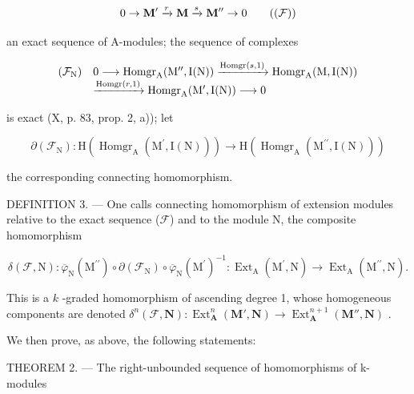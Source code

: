 \[
0 \rightarrow \mathbf {M} ^ {\prime} \xrightarrow {r} \mathbf {M} \xrightarrow {s} \mathbf {M} ^ {\prime \prime} \rightarrow 0\tag{$(\mathcal{F})$}
\]

an exact sequence of A-modules; the sequence of complexes

\[
\begin{array}{r l} (\mathcal {F} _ {\mathrm{N}}) & 0 \longrightarrow \operatorname{Homgr} _ {\mathrm{A}} (\mathrm{M} ^ {\prime \prime}, \mathrm{I} (\mathrm{N})) \xrightarrow {\operatorname{Homgr} (s , 1)} \operatorname{Homgr} _ {\mathrm{A}} (\mathrm{M}, \mathrm{I} (\mathrm{N})) \\ & \xrightarrow {\operatorname{Homgr} (r , 1)} \operatorname{Homgr} _ {\mathrm{A}} (\mathrm{M} ^ {\prime}, \mathrm{I} (\mathrm{N})) \longrightarrow 0 \end{array}
\]

is exact (X, p. 83, prop. 2, a)); let

\[
\partial (\mathcal {F} _ {\mathrm{N}}): \mathrm{H} (\operatorname{Homgr} _ {\mathrm{A}} (\mathrm{M} ^ {\prime}, \mathrm{I} (\mathrm{N}))) \rightarrow \mathrm{H} (\operatorname{Homgr} _ {\mathrm{A}} (\mathrm{M} ^ {\prime \prime}, \mathrm{I} (\mathrm{N})))
\]

the corresponding connecting homomorphism.

DEFINITION 3. --- One calls connecting homomorphism of extension modules relative to the exact sequence (\(\mathcal{F}\)) and to the module N, the composite homomorphism

\[
\delta (\mathcal {F}, \mathrm{N}): \overline {{\varphi}} _ {\mathrm{N}} (\mathrm{M} ^ {\prime \prime}) \circ \partial (\mathcal {F} _ {\mathrm{N}}) \circ \overline {{\varphi}} _ {\mathrm{N}} (\mathrm{M} ^ {\prime}) ^ {- 1}: \operatorname{Ext} _ {\mathrm{A}} (\mathrm{M} ^ {\prime}, \mathrm{N}) \rightarrow \operatorname{Ext} _ {\mathrm{A}} (\mathrm{M} ^ {\prime \prime}, \mathrm{N}).
\]

This is a \(k\) -graded homomorphism of ascending degree 1, whose homogeneous components are denoted \(\delta^{n}(\mathcal{F}, \mathbf{N}) : \operatorname{Ext}_{\mathbf{A}}^{n}(\mathbf{M}', \mathbf{N}) \to \operatorname{Ext}_{\mathbf{A}}^{n+1}(\mathbf{M}'', \mathbf{N})\) .

We then prove, as above, the following statements:

THEOREM 2. --- The right-unbounded sequence of homomorphisms of k-modules

